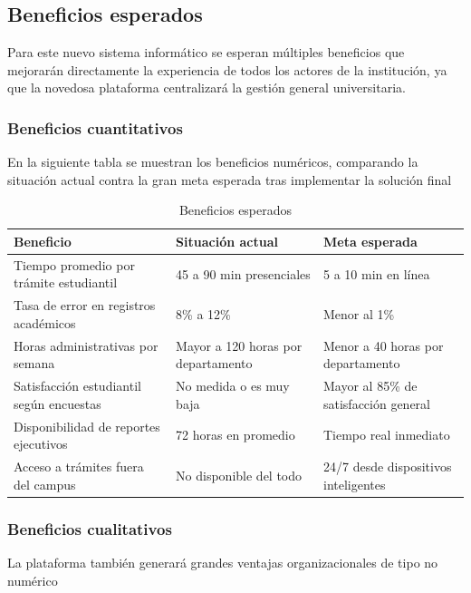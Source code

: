 \documentclass[11pt,spanish]{article}
\begin{document}
\subsection{Beneficios esperados}

Para este nuevo sistema informático se esperan múltiples beneficios que mejorarán directamente la experiencia de todos los actores de la institución, ya que la novedosa plataforma centralizará la gestión general universitaria.

\subsubsection{Beneficios cuantitativos}

En la siguiente tabla se muestran los beneficios numéricos, comparando la situación actual contra la gran meta esperada tras implementar la solución final

\begin{table}[H]
\centering
\small
\caption{Beneficios esperados}\label{tab:beneficios}
\begin{tabularx}{\textwidth}{p{5.2cm} p{4.1cm} Y}
\toprule
\textbf{Beneficio} & \textbf{Situación actual} & \textbf{Meta esperada} \\
\midrule
Tiempo promedio por trámite estudiantil & 45 a 90 min presenciales & 5 a 10 min en línea \\
Tasa de error en registros académicos & 8\% a 12\% & Menor al 1\% \\
Horas administrativas por semana & Mayor a 120 horas por departamento & Menor a 40 horas por departamento \\
Satisfacción estudiantil según encuestas & No medida o es muy baja & Mayor al 85\% de satisfacción general \\
Disponibilidad de reportes ejecutivos & 72 horas en promedio & Tiempo real inmediato \\
Acceso a trámites fuera del campus & No disponible del todo & 24/7 desde dispositivos inteligentes \\
\bottomrule
\end{tabularx}
\end{table}

\subsubsection{Beneficios cualitativos}

La plataforma también generará grandes ventajas organizacionales de tipo no numérico
\end{document}
